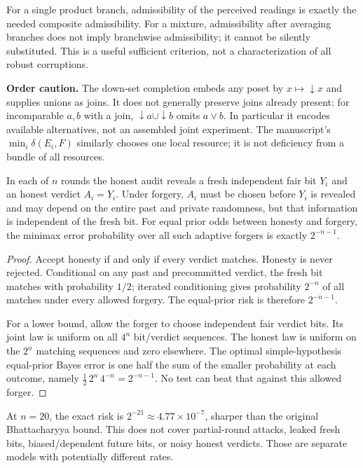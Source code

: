 For a single product branch, admissibility of the perceived readings is exactly the needed composite admissibility. For a mixture, admissibility after averaging branches does not imply branchwise admissibility; it cannot be silently substituted. This is a useful sufficient criterion, not a characterization of all robust corruptions.

\textbf{Order caution.} The down-set completion embeds any poset by $x\mapsto{\downarrow}x$ and supplies unions as joins. It does not generally preserve joins already present: for incomparable $a,b$ with a join, ${\downarrow}a\cup{\downarrow}b$ omits $a\vee b$. In particular it encodes available alternatives, not an assembled joint experiment. The manuscript's $\min_i\delta(E_i,F)$ similarly chooses one local resource; it is not deficiency from a bundle of all resources.


\begin{thmplain}
In each of $n$ rounds the honest audit reveals a fresh independent fair bit $Y_i$ and an honest verdict $A_i=Y_i$. Under forgery, $A_i$ must be chosen before $Y_i$ is revealed and may depend on the entire past and private randomness, but that information is independent of the fresh bit. For equal prior odds between honesty and forgery, the minimax error probability over all such adaptive forgers is exactly $2^{-n-1}$.
\end{thmplain}
\begin{proof}
Accept honesty if and only if every verdict matches. Honesty is never rejected. Conditional on any past and precommitted verdict, the fresh bit matches with probability $1/2$; iterated conditioning gives probability $2^{-n}$ of all matches under every allowed forgery. The equal-prior risk is therefore $2^{-n-1}$.

For a lower bound, allow the forger to choose independent fair verdict bits. Its joint law is uniform on all $4^n$ bit/verdict sequences. The honest law is uniform on the $2^n$ matching sequences and zero elsewhere. The optimal simple-hypothesis equal-prior Bayes error is one half the sum of the smaller probability at each outcome, namely $\tfrac12\,2^n\,4^{-n}=2^{-n-1}$. No test can beat that against this allowed forger.
\end{proof}

At $n=20$, the exact risk is $2^{-21}\approx4.77\times10^{-7}$, sharper than the original Bhattacharyya bound. This does not cover partial-round attacks, leaked fresh bits, biased/dependent future bits, or noisy honest verdicts. Those are separate models with potentially different rates.
